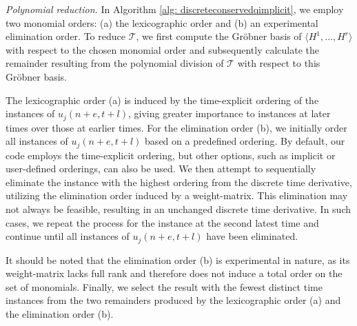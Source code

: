 \documentclass[runningheads]{llncs}
\newcommand{\1}{\chi}
\begin{document}
\emph{Polynomial reduction.}
In Algorithm \ref{alg: discreteconservedqimplicit}, we employ two monomial orders: (a) the lexicographic order and (b) an experimental elimination order. To reduce $\mathcal{T}$, we first compute the Gr\"obner basis of $\langle H^1,\ldots,H^r\rangle$ with respect to the chosen monomial order and subsequently calculate the remainder resulting from the polynomial division of $\mathcal{T}$ with respect to this Gr\"obner basis.

The lexicographic order (a) is induced by the time-explicit ordering of the instances of $u_j(n+e,t+l)$, giving greater importance to instances at later times over those at earlier times. For the elimination order (b), we initially order all instances of $u_j(n+e,t+l)$ based on a predefined ordering. By default, our code employs the time-explicit ordering, but other options, such as implicit or user-defined orderings, can also be used. We then attempt to sequentially eliminate the instance with the highest ordering from the discrete time derivative, utilizing the elimination order induced by a weight-matrix. This elimination may not always be feasible, resulting in an unchanged discrete time derivative. In such cases, we repeat the process for the instance at the second latest time and continue until all instances of $u_j(n+e,t+l)$ have been eliminated.

It should be noted that the elimination order (b) is experimental in nature, as its weight-matrix lacks full rank and therefore does not induce a total order on the set of monomials. Finally, we select the result with the fewest distinct time instances from the two remainders produced by the lexicographic order (a) and the elimination order (b).
\end{document}
